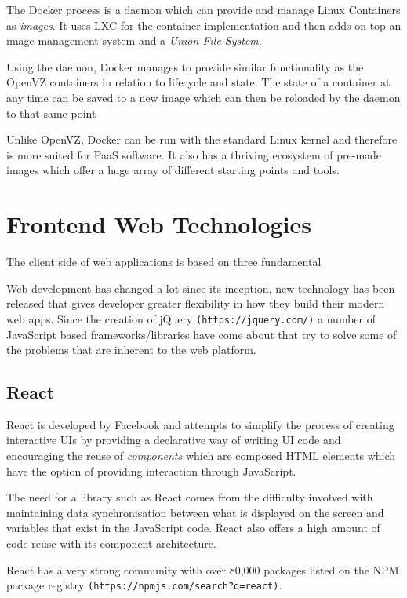 The Docker process is a daemon which can provide and manage Linux Containers as \textit{images}. It uses LXC for the container implementation and then adds on top an image management system and a \textit{Union File System}.

Using the daemon, Docker manages to provide similar functionality as the OpenVZ containers in relation to lifecycle and state. The state of a container at any time can be saved to a new image which can then be reloaded by the daemon to that same point

Unlike OpenVZ, Docker can be run with the standard Linux kernel and therefore is more suited for PaaS software. It also has a thriving ecosystem of pre-made images which offer a huge array of different starting points and tools.


\section{Frontend Web Technologies}

The client side of web applications is based on three fundamental 

Web development has changed a lot since its inception, new technology has been released that gives developer greater flexibility in how they build their modern web apps. Since the creation of jQuery \texttt{(https://jquery.com/)} a number of JavaScript based frameworks/libraries have come about that try to solve some of the problems that are inherent to the web platform.

\subsection{React}

React is developed by Facebook and attempts to simplify the process of creating interactive UIs by providing a declarative way of writing UI code and encouraging the reuse of \textit{components} which are composed HTML elements which have the option of providing interaction through JavaScript.

The need for a library such as React comes from the difficulty involved with maintaining data synchronisation between what is displayed on the screen and variables that exist in the JavaScript code. React also offers a high amount of code reuse with its component architecture. 

React has a very strong community with over 80,000 packages listed on the NPM package registry \texttt{(https://npmjs.com/search?q=react)}.

